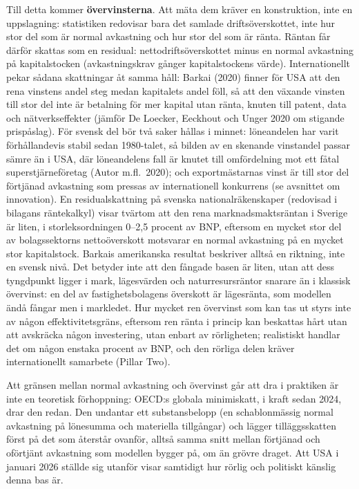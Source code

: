 \documentclass[11pt]{article}
\begin{document}
Till detta kommer \textbf{övervinsterna}. Att mäta dem kräver en konstruktion, inte en uppslagning: statistiken redovisar bara det samlade driftsöverskottet, inte hur stor del som är normal avkastning och hur stor del som är ränta. Räntan får därför skattas som en residual: nettodriftsöverskottet minus en normal avkastning på kapitalstocken (avkastningskrav gånger kapitalstockens värde). Internationellt pekar sådana skattningar åt samma håll: Barkai (2020) finner för USA att den rena vinstens andel steg medan kapitalets andel föll, så att den växande vinsten till stor del inte är betalning för mer kapital utan ränta, knuten till patent, data och nätverkseffekter (jämför De Loecker, Eeckhout och Unger 2020 om stigande prispåslag). För svensk del bör två saker hållas i minnet: löneandelen har varit förhållandevis stabil sedan 1980-talet, så bilden av en skenande vinstandel passar sämre än i USA, där löneandelens fall är knutet till omfördelning mot ett fåtal superstjärneföretag (Autor m.fl.\ 2020); och exportmästarnas vinst är till stor del förtjänad avkastning som pressas av internationell konkurrens (se avsnittet om innovation). En residualskattning på svenska nationalräkenskaper (redovisad i bilagans räntekalkyl) visar tvärtom att den rena marknadsmaktsräntan i Sverige är liten, i storleksordningen 0--2,5 procent av BNP, eftersom en mycket stor del av bolagssektorns nettoöverskott motsvarar en normal avkastning på en mycket stor kapitalstock. Barkais amerikanska resultat beskriver alltså en riktning, inte en svensk nivå. Det betyder inte att den fångade basen är liten, utan att dess tyngdpunkt ligger i mark, lägesvärden och naturresursräntor snarare än i klassisk övervinst: en del av fastighetsbolagens överskott är lägesränta, som modellen ändå fångar men i markledet. Hur mycket ren övervinst som kan tas ut styrs inte av någon effektivitetsgräns, eftersom ren ränta i princip kan beskattas hårt utan att avskräcka någon investering, utan enbart av rörligheten; realistiskt handlar det om någon enstaka procent av BNP, och den rörliga delen kräver internationellt samarbete (Pillar Two).

Att gränsen mellan normal avkastning och övervinst går att dra i praktiken är inte en teoretisk förhoppning: OECD:s globala minimiskatt, i kraft sedan 2024, drar den redan. Den undantar ett substansbelopp (en schablonmässig normal avkastning på lönesumma och materiella tillgångar) och lägger tilläggsskatten först på det som återstår ovanför, alltså samma snitt mellan förtjänad och oförtjänt avkastning som modellen bygger på, om än grövre draget. Att USA i januari 2026 ställde sig utanför visar samtidigt hur rörlig och politiskt känslig denna bas är.
\end{document}
